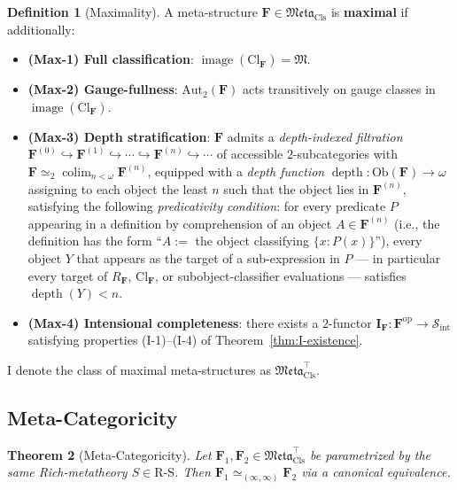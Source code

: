 \documentclass[11pt]{article}
\theoremstyle{plain}
\newtheorem{theorem}{Theorem}[section]
\theoremstyle{definition}
\newtheorem{definition}[theorem]{Definition}
\newcommand{\RS}{\mathrm{R\text{-}S}}
\newcommand{\cS}{\mathcal{S}}
\newcommand{\fM}{\mathfrak{M}}
\newcommand{\Meta}{\mathfrak{Meta}}
\newcommand{\Sint}{\cS_{\mathrm{int}}}
\newcommand{\Ob}{\mathrm{Ob}}
\newcommand{\Cl}{\mathrm{Cl}}
\newcommand{\II}{\mathbf{I}}
\DeclareMathOperator{\colim}{colim}
\DeclareMathOperator{\image}{image}
\DeclareMathOperator{\dep}{depth}
\begin{document}
\begin{definition}[Maximality]\label{def:maximality}
A meta-structure $\mathbf{F} \in \Meta_{\mathrm{Cls}}$ is \textbf{maximal} if additionally:
\begin{itemize}
\item \textbf{(Max-1) Full classification}: $\image(\Cl_{\mathbf{F}}) = \fM$.
\item \textbf{(Max-2) Gauge-fullness}: $\mathrm{Aut}_2(\mathbf{F})$ acts transitively on gauge classes in $\image(\Cl_{\mathbf{F}})$.
\item \textbf{(Max-3) Depth stratification}: $\mathbf{F}$ admits a \emph{depth-indexed filtration} $\mathbf{F}^{(0)} \hookrightarrow \mathbf{F}^{(1)} \hookrightarrow \cdots \hookrightarrow \mathbf{F}^{(n)} \hookrightarrow \cdots$ of accessible $2$-subcategories with $\mathbf{F} \simeq_2 \colim_{n < \omega} \mathbf{F}^{(n)}$, equipped with a \emph{depth function} $\dep : \Ob(\mathbf{F}) \to \omega$ assigning to each object the least $n$ such that the object lies in $\mathbf{F}^{(n)}$, satisfying the following \emph{predicativity condition}: for every predicate $P$ appearing in a definition by comprehension of an object $A \in \mathbf{F}^{(n)}$ (i.e., the definition has the form ``$A :=$ the object classifying $\{x : P(x)\}$''), every object $Y$ that appears as the target of a sub-expression in $P$ --- in particular every target of $R_\mathbf{F}$, $\Cl_\mathbf{F}$, or subobject-classifier evaluations --- satisfies $\dep(Y) < n$.
\item \textbf{(Max-4) Intensional completeness}: there exists a $2$-functor $\II_{\mathbf{F}} : \mathbf{F}^{\mathrm{op}} \to \Sint$ satisfying properties (I-1)--(I-4) of Theorem~\ref{thm:I-existence}.
\end{itemize}
I denote the class of maximal meta-structures as $\Meta_{\mathrm{Cls}}^{\top}$.
\end{definition}

\subsection{Meta-Categoricity}

\begin{theorem}[Meta-Categoricity]\label{thm:meta-cat}
Let $\mathbf{F}_1, \mathbf{F}_2 \in \Meta_{\mathrm{Cls}}^{\top}$ be parametrized by the same Rich-metatheory $S \in \RS$. Then $\mathbf{F}_1 \simeq_{(\infty, \infty)} \mathbf{F}_2$ via a canonical equivalence.
\end{theorem}
\end{document}

